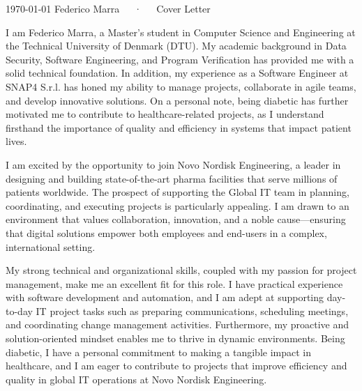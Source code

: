 \documentclass[11pt, a4paper]{awesome-cv}
\begin{document}
\makecvheader[R]

\makecvfooter
  {\today}
  {Federico Marra~~~·~~~Cover Letter}
  {}

\makelettertitle

\begin{cvletter}

I am Federico Marra, a Master’s student in Computer Science and Engineering at the Technical University of Denmark (DTU). My academic background in Data Security, Software Engineering, and Program Verification has provided me with a solid technical foundation. In addition, my experience as a Software Engineer at SNAP4 S.r.l. has honed my ability to manage projects, collaborate in agile teams, and develop innovative solutions. On a personal note, being diabetic has further motivated me to contribute to healthcare-related projects, as I understand firsthand the importance of quality and efficiency in systems that impact patient lives.

I am excited by the opportunity to join Novo Nordisk Engineering, a leader in designing and building state-of-the-art pharma facilities that serve millions of patients worldwide. The prospect of supporting the Global IT team in planning, coordinating, and executing projects is particularly appealing. I am drawn to an environment that values collaboration, innovation, and a noble cause—ensuring that digital solutions empower both employees and end-users in a complex, international setting.

My strong technical and organizational skills, coupled with my passion for project management, make me an excellent fit for this role. I have practical experience with software development and automation, and I am adept at supporting day-to-day IT project tasks such as preparing communications, scheduling meetings, and coordinating change management activities. Furthermore, my proactive and solution-oriented mindset enables me to thrive in dynamic environments. Being diabetic, I have a personal commitment to making a tangible impact in healthcare, and I am eager to contribute to projects that improve efficiency and quality in global IT operations at Novo Nordisk Engineering.

\end{cvletter}

\makeletterclosing
\end{document}
